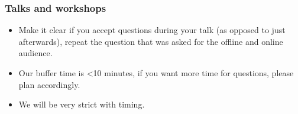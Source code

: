 \documentclass{beamer}
\begin{document}
\begin{frame}
  \frametitle{Talks and workshops}
  \begin{itemize}
  \item Make it clear if you accept questions during your talk (as opposed to just afterwards), repeat the question that was asked for the offline and online audience.
  \item Our buffer time is <10 minutes, if you want more time for questions, please plan accordingly.
  \item We will be very strict with timing.
  \end{itemize}
\end{frame}
\end{document}
